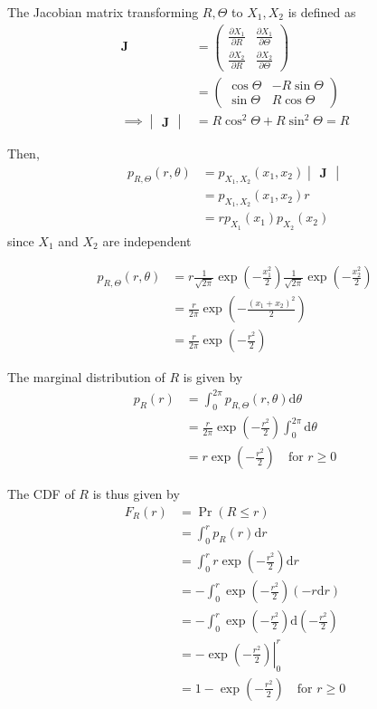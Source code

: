 \documentclass[journal,12pt,twocolumn]{IEEEtran}
\providecommand{\pr}[1]{\ensuremath{\Pr\left(#1\right)}}
\providecommand{\brak}[1]{\ensuremath{\left(#1\right)}}
\providecommand{\der}[1]{\mathrm{d} #1}
\let\vec\mathbf
\numberwithin{equation}{section}
\renewcommand\thesection{\arabic{section}}
\newcommand{\myvec}[1]{\ensuremath{\begin{pmatrix}#1\end{pmatrix}}}
\newcommand{\mydet}[1]{\ensuremath{\begin{vmatrix}#1\end{vmatrix}}}
\begin{document}
\begin{enumerate}[label=\thesection.\arabic*,ref=\thesection.\theenumi]
	 The Jacobian matrix transforming $R, \Theta$ to $X_1, X_2$  is defined as 
	 \begin{align}
		\vec{J} &= \myvec{
			\frac{\partial X_1}{\partial R} & \frac{\partial X_1}{\partial \Theta} \\
			\frac{\partial X_2}{\partial R} & \frac{\partial X_2}{\partial \Theta}
		} \\
		&= \myvec{
			\cos\Theta & -R\sin\Theta \\
			\sin\Theta & R\cos\Theta
		} \\
		\implies \mydet{\vec{J}} &= R\cos^2\Theta + R\sin^2\Theta = R
	\end{align}
	
	Then,
	\begin{align}
		p_{R, \Theta} \brak{r, \theta} &= p_{X_1,X_2}\brak{x_1,x_2} \mydet{\vec{J}} \\
		&= p_{X_1,X_2}\brak{x_1,x_2} r \\
		&= r p_{X_1}(x_1) p_{X_2}(x_2)
	\end{align}
	since $X_1$ and $X_2$ are independent 
	
	\begin{align}
		p_{R, \Theta} \brak{r, \theta} &= r \frac{1}{\sqrt{2\pi}} \exp\brak{-\frac{x_1^2}{2}} \frac{1}{\sqrt{2\pi}} \exp\brak{-\frac{x_2^2}{2}} \\
		&= \frac{r}{2\pi} \exp\brak{-\frac{(x_1+x_2)^2}{2}} \\
		&= \frac{r}{2\pi} \exp\brak{-\frac{r^2}{2}} 
	\end{align}
	
	The marginal distribution of $R$ is given by
	\begin{align}
		p_R(r) &= \int_0^{2\pi} p_{R, \Theta} \brak{r, \theta} \der{\theta} \\
		&= \frac{r}{2\pi} \exp\brak{-\frac{r^2}{2}} \int_0^{2\pi}\der{\theta} \\
		&= r \exp\brak{-\frac{r^2}{2}} \quad \text{for } r \ge 0
	\end{align}		
	
	The CDF of $R$ is thus given by
	\begin{align}
		F_R(r) &= \pr{R \le r} \\
		&= \int_0^r p_R(r) \der{r} \\
		&= \int_0^r r \exp\brak{-\frac{r^2}{2}} \der{r} \\
		&= - \int_0^r \exp\brak{-\frac{r^2}{2}} (-r\der{r}) \\
		&= - \int_0^r \exp\brak{-\frac{r^2}{2}} \der\brak{-\frac{r^2}{2}} \\
		&= - \left. \exp\brak{-\frac{r^2}{2}} \right|_0^r \\
		&= 1 - \exp\brak{-\frac{r^2}{2}} \quad \text{for } r \ge 0
	\end{align}		
	

\end{enumerate}
\end{document}
